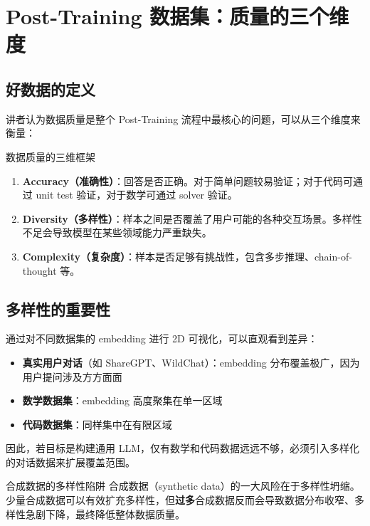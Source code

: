 \section{Post-Training 数据集：质量的三个维度}

\subsection{好数据的定义}

讲者认为数据质量是整个 Post-Training 流程中最核心的问题，可以从三个维度来衡量：

\begin{importantbox}{数据质量的三维框架}
\begin{enumerate}
    \item \textbf{Accuracy（准确性）}：回答是否正确。对于简单问题较易验证；对于代码可通过 unit test 验证，对于数学可通过 solver 验证。
    \item \textbf{Diversity（多样性）}：样本之间是否覆盖了用户可能的各种交互场景。多样性不足会导致模型在某些领域能力严重缺失。
    \item \textbf{Complexity（复杂度）}：样本是否足够有挑战性，包含多步推理、chain-of-thought 等。
\end{enumerate}
\end{importantbox}

\subsection{多样性的重要性}

通过对不同数据集的 embedding 进行 2D 可视化，可以直观看到差异：

\begin{itemize}
    \item \textbf{真实用户对话}（如 ShareGPT、WildChat）：embedding 分布覆盖极广，因为用户提问涉及方方面面
    \item \textbf{数学数据集}：embedding 高度聚集在单一区域
    \item \textbf{代码数据集}：同样集中在有限区域
\end{itemize}

因此，若目标是构建通用 LLM，仅有数学和代码数据远远不够，必须引入多样化的对话数据来扩展覆盖范围。

\begin{warningbox}{合成数据的多样性陷阱}
合成数据（synthetic data）的一大风险在于多样性坍缩。少量合成数据可以有效扩充多样性，但\textbf{过多}合成数据反而会导致数据分布收窄、多样性急剧下降，最终降低整体数据质量。
\end{warningbox}

